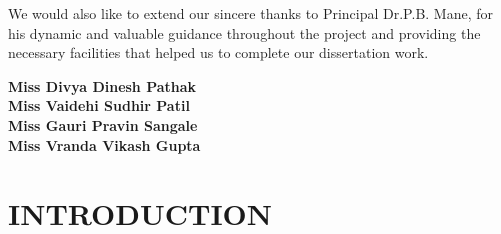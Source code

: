 \documentclass[12pt]{report}	%
\begin{document}
We would also like to extend our sincere thanks to Principal Dr.P.B. Mane, for his dynamic and valuable guidance throughout the project and providing the necessary facilities that helped us to complete our dissertation work.

\vspace{20mm} 
\begin{flushright}
{
\begin{minipage}{2.7 in}
\textbf{Miss Divya Dinesh Pathak}\\
\textbf{Miss Vaidehi Sudhir Patil}\\
\textbf{Miss Gauri Pravin Sangale}\\
\textbf{Miss Vranda Vikash Gupta}\\
\end{minipage}} \hfill
\end{flushright}
\newpage


\tableofcontents
\newpage
\newpage
{}
\listoffigures
\newpage	










\fancyhf{}
\fancyhead[LE]{\leftmark}
\renewcommand{\footrulewidth}{0.4pt}
\pagestyle{fancy}

\chapter{INTRODUCTION}
\end{document}
